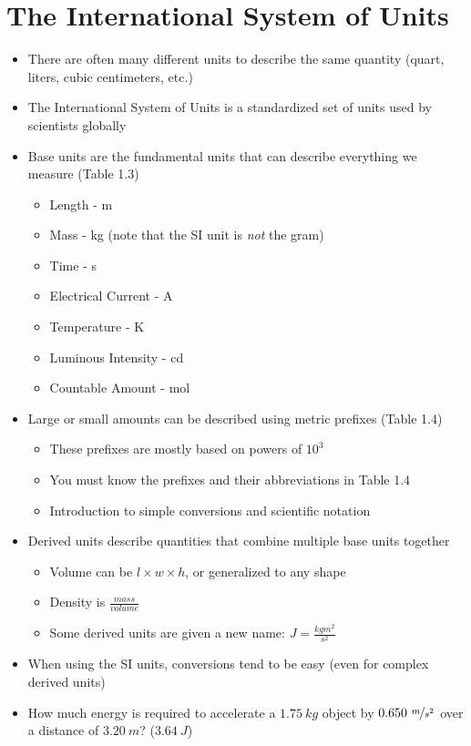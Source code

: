 \documentclass[12pt, openany, letterpaper]{memoir}
\begin{document}
\section{The International System of Units}
\begin{itemize}
	\item There are often many different units to describe the same quantity (quart, liters, cubic centimeters, etc.)
	\item The International System of Units is a standardized set of units used by scientists globally
	\item Base units are the fundamental units that can describe everything we measure (Table 1.3)
	      \begin{itemize}
		      \item Length - m
		      \item Mass - kg (note that the SI unit is \emph{not} the gram)
		      \item Time - s
		      \item Electrical Current - A
		      \item Temperature - K
		      \item Luminous Intensity - cd
		      \item Countable Amount - mol
	      \end{itemize}
	\item Large or small amounts can be described using metric prefixes (Table 1.4)
	      \begin{itemize}
		      \item These prefixes are mostly based on powers of $10^3$
		      \item You must know the prefixes and their abbreviations in Table 1.4
		      \item Introduction to simple conversions and scientific notation
	      \end{itemize}
	\item Derived units describe quantities that combine multiple base units together
	      \begin{itemize}
		      \item Volume can be $l\times w\times h$, or generalized to any shape
		      \item Density is $\frac{mass}{volume}$
		      \item Some derived units are given a new name: $J=\frac{kgm^2}{s^2}$
	      \end{itemize}
	\item When using the SI units, conversions tend to be easy (even for complex derived units)
	\item How much energy is required to accelerate a $1.75~kg$ object by $0.650~\nicefrac{m}{s^2}$ over a distance of $3.20~m$? ($3.64~J$)
\end{itemize}
\end{document}
